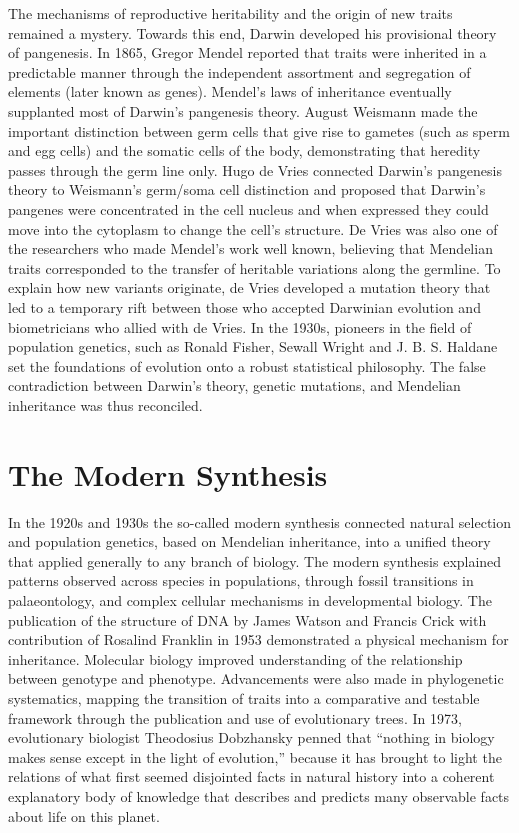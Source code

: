 The mechanisms of reproductive heritability and the origin of new traits remained a mystery. Towards this end, Darwin developed his provisional theory of pangenesis. In 1865, Gregor Mendel reported that traits were inherited in a predictable manner through the independent assortment and segregation of elements (later known as genes). Mendel's laws of inheritance eventually supplanted most of Darwin's pangenesis theory. August Weismann made the important distinction between germ cells that give rise to gametes (such as sperm and egg cells) and the somatic cells of the body, demonstrating that heredity passes through the germ line only. Hugo de Vries connected Darwin's pangenesis theory to Weismann's germ/soma cell distinction and proposed that Darwin's pangenes were concentrated in the cell nucleus and when expressed they could move into the cytoplasm to change the cell's structure. De Vries was also one of the researchers who made Mendel's work well known, believing that Mendelian traits corresponded to the transfer of heritable variations along the germline. To explain how new variants originate, de Vries developed a mutation theory that led to a temporary rift between those who accepted Darwinian evolution and biometricians who allied with de Vries. In the 1930s, pioneers in the field of population genetics, such as Ronald Fisher, Sewall Wright and J. B. S. Haldane set the foundations of evolution onto a robust statistical philosophy. The false contradiction between Darwin's theory, genetic mutations, and Mendelian inheritance was thus reconciled.

\hypertarget{the-modern-synthesis}{%
\section{The Modern Synthesis}\label{the-modern-synthesis}}

In the 1920s and 1930s the so-called modern synthesis connected natural selection and population genetics, based on Mendelian inheritance, into a unified theory that applied generally to any branch of biology. The modern synthesis explained patterns observed across species in populations, through fossil transitions in palaeontology, and complex cellular mechanisms in developmental biology. The publication of the structure of DNA by James Watson and Francis Crick with contribution of Rosalind Franklin in 1953 demonstrated a physical mechanism for inheritance. Molecular biology improved understanding of the relationship between genotype and phenotype. Advancements were also made in phylogenetic systematics, mapping the transition of traits into a comparative and testable framework through the publication and use of evolutionary trees. In 1973, evolutionary biologist Theodosius Dobzhansky penned that ``nothing in biology makes sense except in the light of evolution,'' because it has brought to light the relations of what first seemed disjointed facts in natural history into a coherent explanatory body of knowledge that describes and predicts many observable facts about life on this planet.

